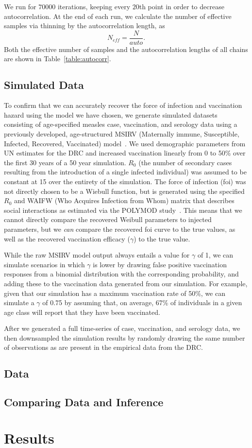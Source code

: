 \documentclass[nofootinbib,aps,pre,twocolumn,superscriptaddress,showkeys,showpacs]{revtex4-1}
\begin{document}
We run for $70000$ iterations, keeping every $20$th point in order to decrease autocorrelation. At the end of each run, we calculate the number of effective samples via thinning by the autocorrelation length, as
\begin{equation}
N_{eff} = \frac{N}{auto}.
\end{equation}
Both the effective number of samples and the autocorrelation lengths of all chains are shown in Table~\ref{table:autocorr}.

\subsection{Simulated Data\label{subsec:SimData}}
To confirm that we can accurately recover the force of infection and vaccination hazard using the model we have chosen, we generate simulated datasets consisting of age-specified measles case, vaccination, and serology data using a previously developed, age-structured MSIRV (Maternally immune, Susceptible, Infected, Recovered, Vaccinated) model~\cite{Metcalf2012}. We used demographic parameters from UN estimates for the DRC and increased vaccination linearly from 0 to 50\% over the first 30 years of a 50 year simulation. $R_{0}$ (the number of secondary cases resulting from the introduction of a single infected individual) was assumed to be constant at 15 over the entirety of the simulation. The force of infection (foi) was not directly chosen to be a Wiebull function, but is generated using the specified $R_0$ and WAIFW (Who Acquires Infection from Whom) matrix that describes social interactions as estimated via the POLYMOD study~\cite{Mossong2008}. This means that we cannot directly compare the recovered Weibull parameters to injected parameters, but we \emph{can} compare the recovered foi curve to the true values, as well as the recovered vaccination efficacy ($\gamma$) to the true value. 

While the raw MSIRV model output always entails a value for $\gamma$ of 1, we can simulate scenarios in which $\gamma$ is lower by drawing false positive vaccination responses from a binomial distribution with the corresponding probability, and adding these to the vaccination data generated from our simulation. For example, given that our simulation has a maximum vaccination rate of 50\%, we can simulate a $\gamma$ of 0.75 by assuming that, on average, 67\% of individuals in a given age class will report that they have been vaccinated.

After we generated a full time-series of case, vaccination, and serology data, we then downsampled the simulation results by randomly drawing the same number of observations as are present in the empirical data from the DRC.

\subsection{Data \label{subsec:Data}}

\subsection{Comparing Data and Inference \label{subsec:Comp}}

\section{Results \label{sec:Results}}



\end{document}
